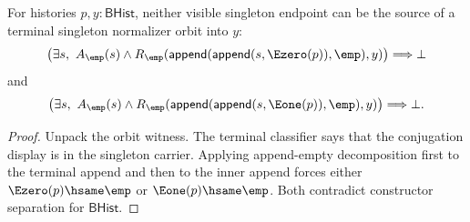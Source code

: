 \begin{theorem}
\label{thm:group-singleton-normalizer-orbit-visible-source-absurd}
For histories $p,y:\mathsf{BHist}$, neither visible singleton endpoint can be
the source of a terminal singleton normalizer orbit into $y$:
$$
\bigl(\exists s,\ A_{\emp}(s)\land
R_{\emp}(\mathsf{append}(\mathsf{append}(s,\Ezero(p)),\emp),y)\bigr)
\Longrightarrow \bot
$$
and
$$
\bigl(\exists s,\ A_{\emp}(s)\land
R_{\emp}(\mathsf{append}(\mathsf{append}(s,\Eone(p)),\emp),y)\bigr)
\Longrightarrow \bot.
$$
\end{theorem}
\begin{proof}
Unpack the orbit witness. The terminal classifier says that the conjugation
display is in the singleton carrier. Applying append-empty decomposition first
to the terminal append and then to the inner append forces either
$\Ezero(p)\hsame\emp$ or $\Eone(p)\hsame\emp$. Both contradict constructor
separation for $\mathsf{BHist}$.
\end{proof}

